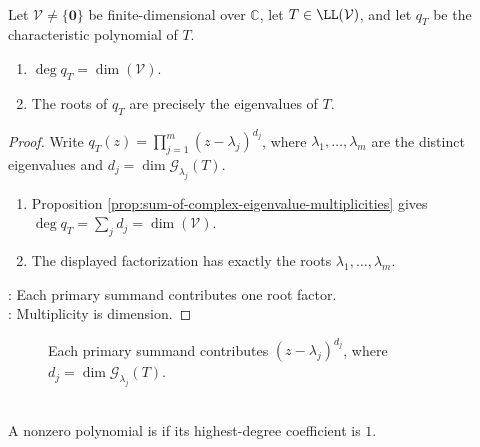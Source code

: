 \begin{proposition} \label{prop:operator-characteristic-polynomial-degree-roots} \\
Let $\mathcal{V}\neq\{\mathbf{0}\}$ be finite-dimensional over $\mathbb{C}$, let $T\in\LL(\mathcal{V})$, and let $q_T$ be the characteristic polynomial of $T$.
\begin{enumerate}[label=(\roman*)]
\setlength{\itemsep}{0pt}
\item $\deg q_T=\dim(\mathcal{V})$.
\item The roots of $q_T$ are precisely the eigenvalues of $T$.
\end{enumerate}
\begin{proof}
Write $q_T(z)=\prod\limits_{j=1}^{m}(z-\lambda_j)^{d_j}$, where $\lambda_1,\ldots,\lambda_m$ are the distinct eigenvalues and $d_j=\dim \mathcal{G}_{\lambda_j}(T)$.
\begin{enumerate}[label=(\roman*)]
\setlength{\itemsep}{0pt}
\item Proposition \ref{prop:sum-of-complex-eigenvalue-multiplicities} gives $\deg q_T=\sum_jd_j=\dim(\mathcal{V})$.
\item The displayed factorization has exactly the roots $\lambda_1,\ldots,\lambda_m$.
\end{enumerate}
: Each primary summand contributes one root factor.\\
: Multiplicity is dimension.
\end{proof}
\end{proposition}

\begin{figure}[H]
  \centering
  
  \caption{Each primary summand contributes $(z-\lambda_j)^{d_j}$, where $d_j=\dim \mathcal{G}_{\lambda_j}(T)$.}
  \label{fig:operator-characteristic-polynomial-primary-blocks}
\end{figure}

\begin{definition} \label{def:monic-polynomial} \\
A nonzero polynomial is  if its highest-degree coefficient is $1$.
\end{definition}

